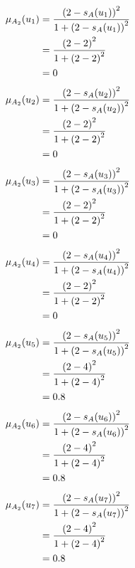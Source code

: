\documentclass[a4paper]{book}
\begin{document}
				\\
				\\
				\\
				\begin{align}
					\mu_{A_2}(u_1) &= \frac{\left(2-s_A(u_1)\right)^2}{1 + \left(2-s_A(u_1)\right)^2}\\
					&= \frac{\left(2-2\right)^2}{1 + \left(2-2\right)^2} \notag \\
					&= 0 \notag
				\end{align}
				\begin{align}
					\mu_{A_2}(u_2) &= \frac{\left(2-s_A(u_2)\right)^2}{1 + \left(2-s_A(u_2)\right)^2}\\
					&= \frac{\left(2-2\right)^2}{1 + \left(2-2\right)^2} \notag \\
					&= 0 \notag
				\end{align}
				\begin{align}
					\mu_{A_2}(u_3) &= \frac{\left(2-s_A(u_3)\right)^2}{1 + \left(2-s_A(u_3)\right)^2}\\
					&= \frac{\left(2-2\right)^2}{1 + \left(2-2\right)^2} \notag \\
					&= 0 \notag
				\end{align}
				\begin{align}
					\mu_{A_2}(u_4) &= \frac{\left(2-s_A(u_4)\right)^2}{1 + \left(2-s_A(u_4)\right)^2}\\
					&= \frac{\left(2-2\right)^2}{1 + \left(2-2\right)^2} \notag \\
					&= 0 \notag
				\end{align}
				\begin{align}
					\mu_{A_2}(u_5) &= \frac{\left(2-s_A(u_5)\right)^2}{1 + \left(2-s_A(u_5)\right)^2}\\
					&= \frac{\left(2-4\right)^2}{1 + \left(2-4\right)^2} \notag \\
					&= 0.8 \notag
				\end{align}
				\begin{align}
					\mu_{A_2}(u_6) &= \frac{\left(2-s_A(u_6)\right)^2}{1 + \left(2-s_A(u_6)\right)^2}\\
					&= \frac{\left(2-4\right)^2}{1 + \left(2-4\right)^2} \notag \\
					&= 0.8 \notag
				\end{align}
				\begin{align}
					\mu_{A_2}(u_7) &= \frac{\left(2-s_A(u_7)\right)^2}{1 + \left(2-s_A(u_7)\right)^2}\\
					&= \frac{\left(2-4\right)^2}{1 + \left(2-4\right)^2} \notag \\
					&= 0.8 \notag
				\end{align}
\end{document}
